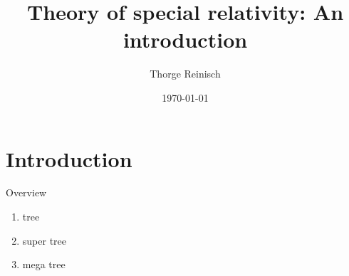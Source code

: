 \documentclass[aspectratio=169,
							12pt,
							titlepage,
							bibliography=totoc,
							xcolor=dvipsnames,
							]{beamer}
\begin{document}
	\title{Theory of special relativity: An introduction} 
	\author{Thorge Reinisch} 
	\date{\today} 
	
	\frame{\titlepage}
	
	
	\section{Introduction}

    \begin{frame}{Overview}
        \begin{enumerate}
            \setlength{\itemsep}{20pt}
            \item tree
            \item super tree
            \item mega tree
        \end{enumerate}
	\end{frame}
\end{document}
